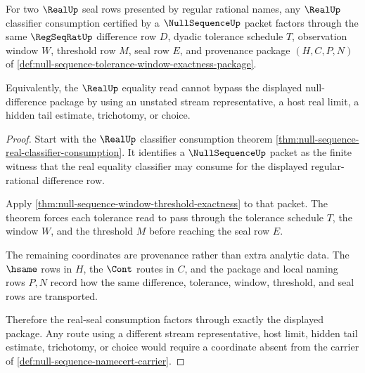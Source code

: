 \begin{theorem}
\label{thm:null-sequence-real-seal-factorization}
For two $\RealUp$ seal rows presented by regular rational names, any $\RealUp$ classifier consumption certified by a $\NullSequenceUp$ packet factors through the same $\RegSeqRatUp$ difference row $D$, dyadic tolerance schedule $T$, observation window $W$, threshold row $M$, seal row $E$, and provenance package $(H,C,P,N)$ of \autoref{def:null-sequence-tolerance-window-exactness-package}.

Equivalently, the $\RealUp$ equality read cannot bypass the displayed null-difference package by using an unstated stream representative, a host real limit, a hidden tail estimate, trichotomy, or choice.
\end{theorem}
\begin{proof}
Start with the $\RealUp$ classifier consumption theorem \autoref{thm:null-sequence-real-classifier-consumption}. It identifies a $\NullSequenceUp$ packet as the finite witness that the real equality classifier may consume for the displayed regular-rational difference row.

Apply \autoref{thm:null-sequence-window-threshold-exactness} to that packet. The theorem forces each tolerance read to pass through the tolerance schedule $T$, the window $W$, and the threshold $M$ before reaching the seal row $E$.

The remaining coordinates are provenance rather than extra analytic data. The $\hsame$ rows in $H$, the $\Cont$ routes in $C$, and the package and local naming rows $P,N$ record how the same difference, tolerance, window, threshold, and seal rows are transported.

Therefore the real-seal consumption factors through exactly the displayed package. Any route using a different stream representative, host limit, hidden tail estimate, trichotomy, or choice would require a coordinate absent from the carrier of \autoref{def:null-sequence-namecert-carrier}.
\end{proof}

